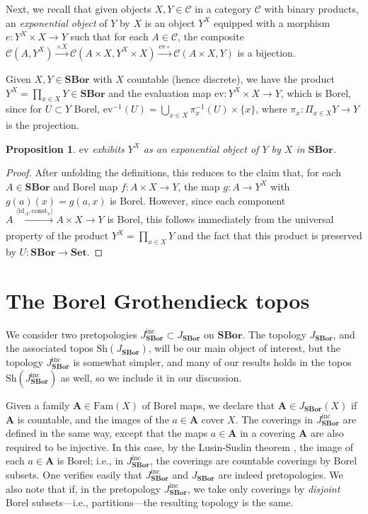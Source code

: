 \documentclass[11pt]{amsart}
\newcommand\bA{\mathbf{A}}
\newcommand\br[1]{\langle{}#1\rangle{}}
\newcommand\cC{\mathcal{C}}
\newcommand\const{\mathrm{const}}
\newcommand\ev{\mathrm{ev}}
\newcommand\Fam{\mathrm{Fam}}
\newcommand\I{^{-1}}
\newcommand\id{\mathrm{id}}
\newcommand\inc{\mathrm{inc}}
\newcommand\SBor{\mathbf{SBor}}
\newcommand\Set{\mathbf{Set}}
\newcommand\set[2][]{#1\{{#2}#1\}}
\newcommand\Sh{\mathrm{Sh}}
\newcommand\tox[2][]{\xrightarrow[#1]{#2}}
\theoremstyle{definition}
\theoremstyle{remark}
\theoremstyle{plain}
\newtheorem{propn}[defn]{Proposition}
\begin{document}
Next, we recall that given objects \( X,Y \in \cC \) in a category \( \cC \) with binary products, an \emph{exponential object} of \( Y \) by \( X \) is an object \( Y^X \) equipped with a morphism \( e \colon Y^X \times X \to Y \) such that for each \( A \in \cC \), the composite \( \cC(A,Y^X) \tox{\times X} \cC(A \times X, Y^X \times X) \tox{\ev \circ} \cC(A \times X, Y) \) is a bijection.

Given \( X,Y \in \SBor \) with \( X \) countable (hence discrete), we have the product \( Y^X = \prod_{x \in X} Y \in \SBor \) and the evaluation map \( \ev \colon Y^X \times X \to Y \), which is Borel, since for \( U \subset Y \) Borel, \( \ev\I(U) = \bigcup_{x \in X} \pi_x\I(U) \times \set{x} \), where \( \pi_x \colon \Pi_{x \in X} Y \to Y \) is the projection.

\begin{propn}\label{propn:sbor-exponentials}
  \( \ev \) exhibits \( Y^X \) as an exponential object of \( Y \) by \( X \) in \( \SBor \).
\end{propn}

\begin{proof}
  After unfolding the definitions, this reduces to the claim that, for each \( A \in \SBor \) and Borel map \( f \colon A \times X \to Y \), the map \( g \colon A \to Y^X \) with \( g(a)(x) = g(a,x) \) is Borel.
  However, since each component \( A \tox{\br{\id_A,\const_x}} A \times X \to Y \) is Borel, this follows immediately from the universal property of the product \( Y^X = \prod_{x \in X} Y \) and the fact that this product is preserved by \( U \colon \SBor \to \Set \).
\end{proof}

\section{The Borel Grothendieck topos}\label{sec:borel-topos}
We consider two pretopologies $J_{\SBor}^\inc \subset J_{\SBor}$ on $\SBor$.
The topology \( J_{\SBor} \), and the associated topos \( \Sh(J_{\SBor}) \), will be our main object of interest, but the topology \( J_{\SBor}^\inc \) is somewhat simpler, and many of our results holds in the topos \( \Sh(J_{\SBor}^\inc) \) as well, so we include it in our discussion.

Given a family \( \bA \in \Fam(X) \) of Borel maps, we declare that \( \bA \in J_{\SBor}(X) \) if \( \bA \) is countable, and the images of the $a \in \bA$ cover $X$.
The coverings in $J_{\SBor}^\inc$ are defined in the same way, except that the maps $a \in \bA$ in a covering \( \bA \) are also required to be injective.
In this case,
by the Lusin-Suslin theorem \cite[Theorem~15.1]{kechris-classical},
the image of each $a \in \bA$ is Borel; i.e., in $J_{\SBor}^\inc$, the coverings are countable coverings by Borel subsets.
One verifies easily that $J_{\SBor}^\inc$ and $J_{\SBor}$ are indeed pretopologies.
We also note that if, in the pretopology $J_{\SBor}^\inc$, we take only coverings by \emph{disjoint} Borel subsets---i.e., partitions---the resulting topology is the same.
\end{document}
